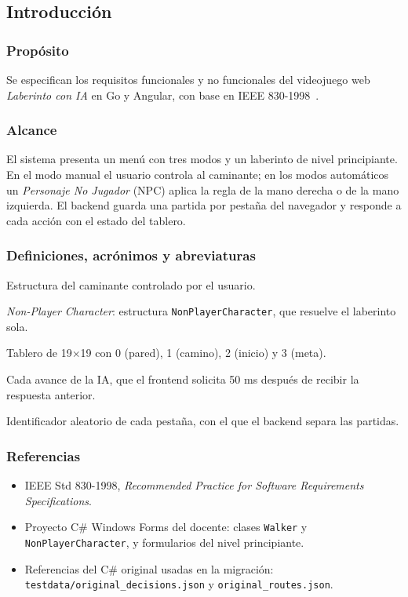 \documentclass[12pt,a4paper]{article}
\begin{document}
\subsection{Introducción}

\subsubsection{Propósito}
Se especifican los requisitos funcionales y no funcionales del videojuego web
\emph{Laberinto con IA} en Go y Angular, con base en IEEE 830-1998~\cite{ieee830}.

\subsubsection{Alcance}
El sistema presenta un menú con tres modos y un laberinto de nivel principiante.
En el modo manual el usuario controla al caminante; en los modos automáticos un
\emph{Personaje No Jugador} (NPC) aplica la regla de la mano derecha o de la mano
izquierda. El backend guarda una partida por pestaña del navegador y responde a
cada acción con el estado del tablero.

\subsubsection{Definiciones, acrónimos y abreviaturas}
\begin{description}[leftmargin=2.8cm,style=nextline]
  \item[Walker] Estructura del caminante controlado por el usuario.
  \item[NPC] \emph{Non-Player Character}: estructura \texttt{NonPlayerCharacter}, que resuelve el laberinto sola.
  \item[Matriz] Tablero de 19$\times$19 con 0 (pared), 1 (camino), 2 (inicio) y 3 (meta).
  \item[Tick] Cada avance de la IA, que el frontend solicita 50 ms después de recibir la respuesta anterior.
  \item[Sesión] Identificador aleatorio de cada pestaña, con el que el backend separa las partidas.
\end{description}

\subsubsection{Referencias}
\begin{itemize}
  \item IEEE Std 830-1998, \emph{Recommended Practice for Software Requirements Specifications}.
  \item Proyecto C\# Windows Forms del docente: clases \texttt{Walker} y \texttt{NonPlayerCharacter}, y formularios del nivel principiante.
  \item Referencias del C\# original usadas en la migración: \texttt{testdata/original\_decisions.json} y \texttt{original\_routes.json}.
\end{itemize}
\end{document}
